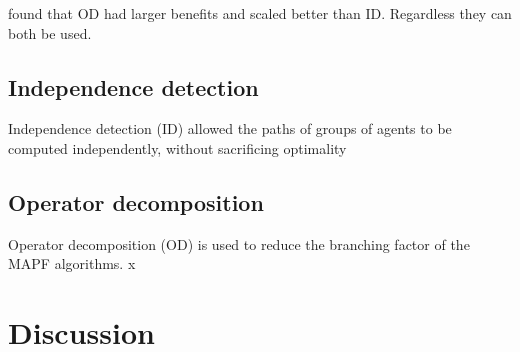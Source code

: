 \documentclass[a4paper,11pt]{article}
\begin{document}
\cite{standley2010finding} found that OD had larger benefits and scaled better than ID. Regardless they can both be used.

\subsection{Independence detection} \label{sec:id}
\cite{standley2010finding} Independence detection (ID) allowed the paths of groups of agents to be computed independently, without sacrificing optimality 


\subsection{Operator decomposition} \label{sec:od}
\cite{standley2010finding} Operator decomposition (OD) is used to reduce the branching factor of the MAPF algorithms.
x
\section{Discussion} \label{sec:discussion}
\end{document}

